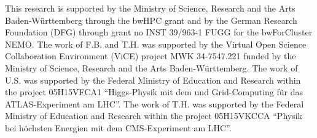 \begin{acknowledgements}
This research is supported by the Ministry of Science, Research and the Arts Baden-W\"urttemberg through the bwHPC grant
and by the German Research Foundation (DFG) through grant no INST
39/963-1 FUGG for the bwForCluster NEMO.
The work of F.B. and T.H. was supported by the Virtual Open Science
Collaboration Environment (ViCE) project MWK 34-7547.221 funded by the
Ministry of Science, Research and the Arts Baden-W\"urttemberg.
The work of U.S. was supported by  the Federal Ministry of Education
and Research within the project 05H15VFCA1
``Higgs-Physik mit dem und Grid-Computing f\"ür das ATLAS-Experiment
am LHC''.
The work of T.H. was supported by the Federal Ministry of Education
and Research within the project 05H15VKCCA ``Physik bei h\"ochsten Energien mit dem CMS-Experiment
    am LHC''.
\end{acknowledgements}


